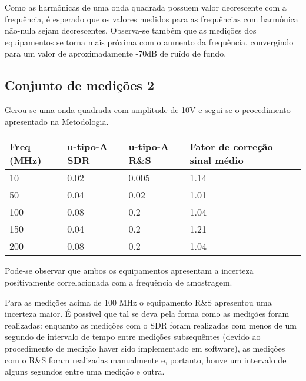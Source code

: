 
Como as harmônicas de uma onda quadrada possuem valor decrescente com a frequência, é esperado que os valores medidos para as frequências com harmônica não-nula sejam decrescentes. Observa-se também que as medições dos equipamentos se torna mais próxima com o aumento da frequência, convergindo para um valor de aproximadamente -70dB de ruído de fundo.

\subsection{Conjunto de medições 2}
Gerou-se uma onda quadrada com amplitude de 10V e segui-se o procedimento apresentado na Metodologia.

\begin{table}[H]
    \centering
    \begin{tabular}{|l|l|l|l|}
    \hline
        Freq (MHz) & u-tipo-A SDR & u-tipo-A R\&S & Fator de correção sinal médio \\ \hline
        10 & 0.02 & 0.005 & 1.14 \\ \hline
        50 & 0.04 & 0.02 & 1.01 \\ \hline
        100 & 0.08 & 0.2 & 1.04 \\ \hline
        150 & 0.04 & 0.2 & 1.21 \\ \hline
        200 & 0.08 & 0.2 & 1.04 \\ \hline
    \end{tabular}
\end{table}

Pode-se observar que ambos os equipamentos apresentam a incerteza positivamente correlacionada com a frequência de amostragem. 

Para as medições acima de 100 MHz o equipamento R\&S apresentou uma incerteza maior. É possível que tal se deva pela forma como as medições foram realizadas: enquanto as medições com o SDR foram realizadas com menos de um segundo de intervalo de tempo entre medições subsequêntes (devido ao procedimento de medição haver sido implementado em software), as medições com o R\&S foram realizadas manualmente e, portanto, houve um intervalo de alguns segundos entre uma medição e outra.